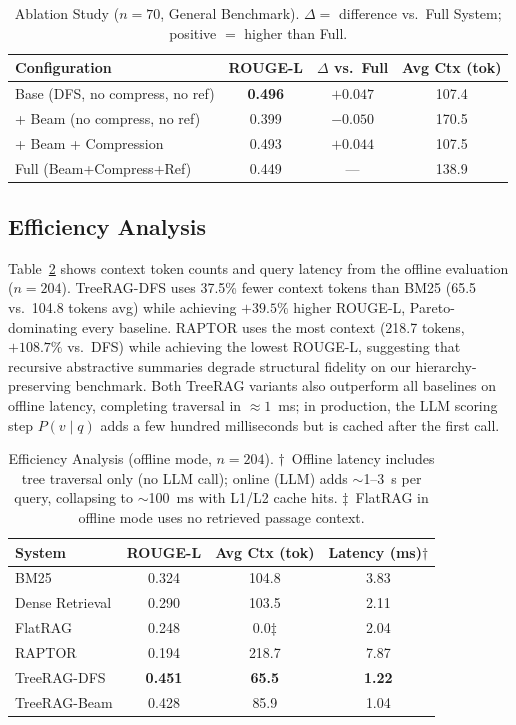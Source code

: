 \documentclass[sigconf,review,anonymous]{acmart}
\begin{document}
\begin{table}[t]
\caption{Ablation Study ($n=70$, General Benchmark). $\Delta=$ difference vs.\
Full System; positive $=$ higher than Full.}
\label{tab:ablation}
\begin{tabular}{lccc}
\toprule
Configuration & ROUGE-L & $\Delta$ vs.\ Full & Avg Ctx (tok) \\
\midrule
Base (DFS, no compress, no ref) & \textbf{0.496} & $+0.047$ & 107.4 \\
+ Beam (no compress, no ref) & 0.399 & $-0.050$ & 170.5 \\
+ Beam + Compression & 0.493 & $+0.044$ & 107.5 \\
Full (Beam+Compress+Ref) & 0.449 & --- & 138.9 \\
\bottomrule
\end{tabular}
\end{table}

\subsection{Efficiency Analysis}
\label{sec:efficiency}
Table~\ref{tab:efficiency} shows context token counts and query latency from the
offline evaluation ($n=204$). TreeRAG-DFS uses 37.5\% fewer context tokens than
BM25 (65.5 vs.\ 104.8 tokens avg) while achieving $+39.5\%$ higher ROUGE-L,
Pareto-dominating every baseline. RAPTOR uses the most context (218.7 tokens,
$+108.7\%$ vs.\ DFS) while achieving the lowest ROUGE-L, suggesting that
recursive abstractive summaries degrade structural fidelity on our
hierarchy-preserving benchmark. Both TreeRAG variants also outperform all
baselines on offline latency, completing traversal in $\approx 1$~ms; in
production, the LLM scoring step $P(v\mid q)$ adds a few hundred milliseconds but
is cached after the first call.

\begin{table}[t]
\caption{Efficiency Analysis (offline mode, $n=204$). $\dagger$~Offline latency
includes tree traversal only (no LLM call); online (LLM) adds $\sim$1--3~s per
query, collapsing to $\sim$100~ms with L1/L2 cache hits. $\ddagger$~FlatRAG in
offline mode uses no retrieved passage context.}
\label{tab:efficiency}
\begin{tabular}{lccc}
\toprule
System & ROUGE-L & Avg Ctx (tok) & Latency (ms)$\dagger$ \\
\midrule
BM25 & 0.324 & 104.8 & 3.83 \\
Dense Retrieval & 0.290 & 103.5 & 2.11 \\
FlatRAG & 0.248 & 0.0$\ddagger$ & 2.04 \\
RAPTOR & 0.194 & 218.7 & 7.87 \\
TreeRAG-DFS & \textbf{0.451} & \textbf{65.5} & \textbf{1.22} \\
TreeRAG-Beam & 0.428 & 85.9 & 1.04 \\
\bottomrule
\end{tabular}
\end{table}
\end{document}
